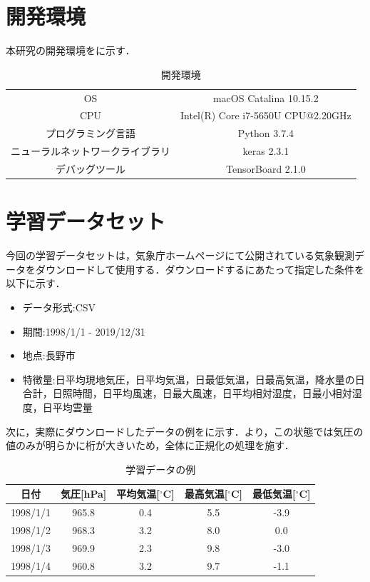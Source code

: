 \documentclass{eithesis}
\begin{document}
	\section{開発環境}
		本研究の開発環境をに示す．
		\begin{table}[htbp]
			\centering 
			\caption{開発環境}
			\label{tab_environment}
			\begin{tabular}{c|c}
				\toprule
				OS & macOS Catalina 10.15.2 \\
				CPU & Intel(R) Core i7-5650U CPU@2.20GHz \\
				プログラミング言語 & Python 3.7.4 \\
				ニューラルネットワークライブラリ & keras 2.3.1 \\
				デバッグツール & TensorBoard 2.1.0 \\
				\bottomrule
			\end{tabular}
		\end{table}

	\section{学習データセット}
		今回の学習データセットは，気象庁ホームページ\cite{data}にて公開されている気象観測データをダウンロードして使用する．ダウンロードするにあたって指定した条件を以下に示す．
		\begin{itemize}
			\item データ形式:CSV
			\item 期間:1998/1/1 - 2019/12/31
			\item 地点:長野市
			\item 特徴量:日平均現地気圧，日平均気温，日最低気温，日最高気温，降水量の日合計，日照時間，日平均風速，日最大風速，日平均相対湿度，日最小相対湿度，日平均雲量
		\end{itemize}

		次に，実際にダウンロードしたデータの例をに示す．より，この状態では気圧の値のみが明らかに桁が大きいため，全体に正規化の処理を施す．
		\begin{table}[htbp]
			\centering 
			\caption{学習データの例}
			\label{tab_sample}
			\begin{tabular}[htbp]{c|c|c|c|c}
				日付 & 気圧[hPa] & 平均気温[$^\circ$C] & 最高気温[$^\circ$C] & 最低気温[$^\circ$C] \\ \hline
				1998/1/1 & 965.8 & 0.4 & 5.5 & -3.9 \\
				1998/1/2 & 968.3 & 3.2 & 8.0 &  0.0 \\
				1998/1/3 & 969.9 & 2.3 & 9.8 & -3.0 \\
				1998/1/4 & 960.8 & 3.2 & 9.7 & -1.1 \\
			\end{tabular}
		\end{table}
\end{document}
